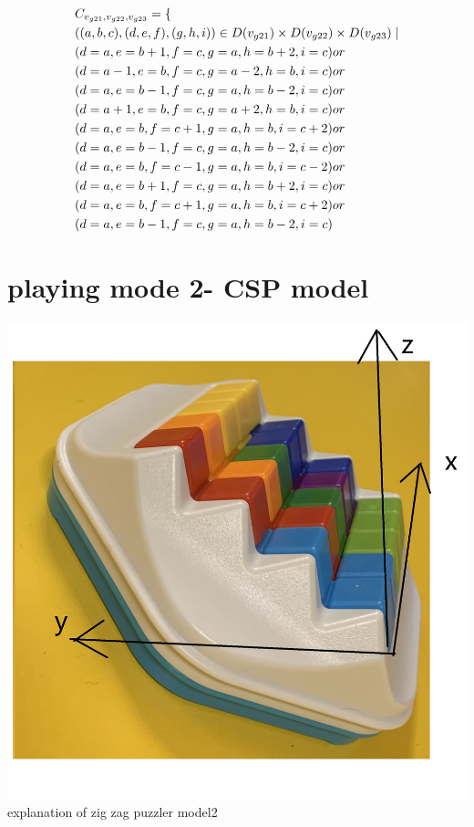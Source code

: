 \begin{align*}
&C_{v_{g21},v_{g22},v_{g23}}=\{\\
&((a,b,c),(d,e,f),(g,h,i))\in D(v_{g21}) \times D(v_{g22})\times D(v_{g23})\mid\\
&(d=a ,e=b+1,f=c , g=a ,h=b+2,i=c )or\\
&(d=a-1,e=b ,f=c , g=a-2,h=b ,i=c )or\\
&(d=a ,e=b-1,f=c , g=a ,h=b-2,i=c )or\\
&(d=a+1,e=b ,f=c , g=a+2,h=b ,i=c )or\\
&(d=a ,e=b ,f=c+1, g=a ,h=b ,i=c+2)or\\
&(d=a ,e=b-1,f=c , g=a ,h=b-2,i=c )or\\
&(d=a ,e=b ,f=c-1, g=a ,h=b ,i=c-2)or\\
&(d=a ,e=b+1,f=c , g=a ,h=b+2,i=c )or\\
&(d=a ,e=b ,f=c+1, g=a ,h=b ,i=c+2)or\\
&(d=a ,e=b-1,f=c , g=a ,h=b-2,i=c )
\end{align*}
\section{playing mode 2- CSP model}
\begin{center}
\includegraphics[scale=0.2]{ZIGZAGmodel2board.jpg} \\
explanation of zig zag puzzler model2
\end{center}
\label{sec:CSP model2}
